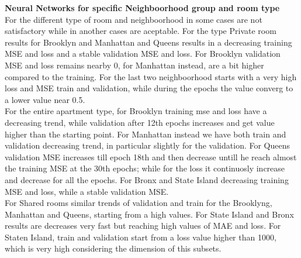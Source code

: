 \documentclass{FR16}
\begin{document}
\newpage 
\noindent \textbf{Neural Networks  for specific Neighboorhood group and room type}\\
For the different type of room and neighboorhood in some cases are not satisfactory while in another cases are aceptable. For the type Private room results for Brooklyn and Manhattan and Queens results in a decreasing training MSE and loss and a stable validation MSE and loss. For Brooklyn validation MSE and loss remains nearby 0, for Manhattan instead, are a bit higher compared to the training. For the last two neighboorhood starts with a very high loss and MSE train and validation, while during the epochs the value converg to a lower value near 0.5.
\\ For the entire apartment type, for Brooklyn training mse and loss have a decreasing trend, while validation after 12th epochs increases and get value higher than the starting point. 
For Manhattan instead we have both train and validation decreasing trend, in particular slightly for the validation. For Queens validation MSE increases till epoch 18th and then decrease untill he reach almost the training MSE at the 30th epochs; while for the loss it continuosly increase and decrease for all the epochs. For Bronx and State Island decreasing training MSE and loss, while a stable validation MSE.  \\ For Shared rooms similar trends of validation and train for the Brooklyng, Manhattan and Queens, starting from a high values. For State Island and Bronx results are decreases very fast but reaching high values of MAE and loss. For Staten Island, train and validation start from a loss value higher than 1000, which is very high considering the dimension of this subsets.  
\end{document}
